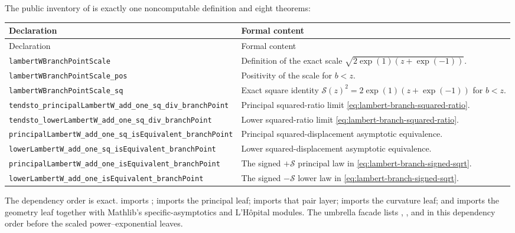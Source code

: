 \documentclass[11pt,oneside]{article}
\theoremstyle{definition}
\theoremstyle{remark}
\newcommand{\lean}[1]{%
  \ifmmode\text{\nolinkurl{#1}}\else\nolinkurl{#1}\fi}
\begin{document}
The public inventory of  is exactly one
noncomputable definition and eight theorems:
\begin{longtable}{@{}>{\raggedright\arraybackslash}p{}
                         >{\raggedright\arraybackslash}p{}@{}}
\toprule
Declaration & Formal content\\
\midrule
\endfirsthead
\toprule
Declaration & Formal content\\
\midrule
\endhead
\lean{lambertWBranchPointScale} & Definition of the exact scale \(\sqrt{2\exp(1)(z+\exp(-1))}\).\\
\lean{lambertWBranchPointScale_pos} & Positivity of the scale for \(b<z\).\\
\lean{lambertWBranchPointScale_sq} & Exact square identity \(\mathcal S(z)^2=2\exp(1)(z+\exp(-1))\) for \(b<z\).\\
\lean{tendsto_principalLambertW_add_one_sq_div_branchPoint} & Principal squared-ratio limit \eqref{eq:lambert-branch-squared-ratio}.\\
\lean{tendsto_lowerLambertW_add_one_sq_div_branchPoint} & Lower squared-ratio limit \eqref{eq:lambert-branch-squared-ratio}.\\
\lean{principalLambertW_add_one_sq_isEquivalent_branchPoint} & Principal squared-displacement asymptotic equivalence.\\
\lean{lowerLambertW_add_one_sq_isEquivalent_branchPoint} & Lower squared-displacement asymptotic equivalence.\\
\lean{principalLambertW_add_one_isEquivalent_branchPoint} & The signed \(+\mathcal S\) principal law in \eqref{eq:lambert-branch-signed-sqrt}.\\
\lean{lowerLambertW_add_one_isEquivalent_branchPoint} & The signed \(-\mathcal S\) lower law in \eqref{eq:lambert-branch-signed-sqrt}.\\
\bottomrule
\end{longtable}

The dependency order is exact.   imports
;  imports the principal
leaf;  imports that pair layer;
 imports the curvature leaf; and
 imports the geometry leaf together with
Mathlib's specific-asymptotics and L'H\^opital modules.  The umbrella facade lists
, , and
 in this dependency order before the scaled
power--exponential leaves.
\end{document}

